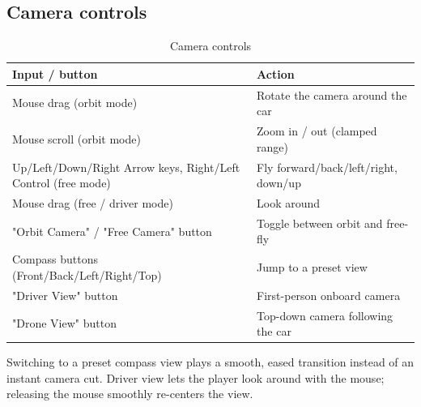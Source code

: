 \documentclass[11pt]{article}
\begin{document}
\subsection{Camera controls}
\begin{table}[h]
\centering
\caption{Camera controls}
\begin{tabular}{ll}
\toprule
Input / button & Action \\
\midrule
Mouse drag (orbit mode) & Rotate the camera around the car \\
Mouse scroll (orbit mode) & Zoom in / out (clamped range) \\
Up/Left/Down/Right Arrow keys, Right/Left Control (free mode) & Fly forward/back/left/right, down/up \\
Mouse drag (free / driver mode) & Look around \\
"Orbit Camera" / "Free Camera" button & Toggle between orbit and free-fly \\
Compass buttons (Front/Back/Left/Right/Top) & Jump to a preset view \\
"Driver View" button & First-person onboard camera \\
"Drone View" button & Top-down camera following the car \\
\bottomrule
\end{tabular}
\end{table}
Switching to a preset compass view plays a smooth, eased transition instead
of an instant camera cut. Driver view lets the player look around with the
mouse; releasing the mouse smoothly re-centers the view.
\end{document}
